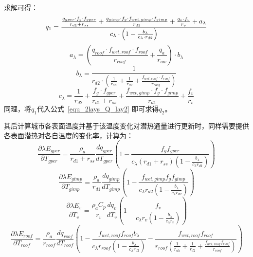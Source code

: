 求解可得：
\begin{equation}
    q_{1} = \\
    \frac{\frac{q_{gper} \cdot f_{g} \cdot f_{gper}}{r_{d1}+r_{ss}} + \frac{q_{gimp} \cdot f_{g} \cdot f_{wet,gimp} \cdot f_{gimp}}{r_{d1} } + \frac{q_{v} \cdot f_v}{r_{v}} + a_{\lambda}}{c_{\lambda} \cdot \left( 1 - \frac{b_{\lambda}}{c_{\lambda} \cdot r_{d2}}\right)}
\end{equation}
%
\begin{equation}
    a_{\lambda}= \left(\frac{q_{roof} \cdot f_{wet,roof} \cdot f_{roof}}{r_{roof}} + \frac{q_a}{r_{aw}}\right) \cdot b_{\lambda}
\end{equation}
%
\begin{equation}
    b_{\lambda} = \frac{1}{r_{d2} \cdot \left( \frac{1}{r_{aw}} + \frac{1}{r_{d2}} + \frac{f_{wet,roof} \cdot f_{roof}}{r_{roof}} \right)}
\end{equation}
%
\begin{equation}
    c_{\lambda} = \frac{1}{r_{d2}}+\frac{f_g \cdot f_{gper}}{r_{d1}+r_{ss}} + \frac{f_{wet,gimp} \cdot f_g \cdot f_{gimp}}{r_{d1}} + \frac{f_v}{r_{v}}
\end{equation}
同理，将$q_{1}$代入公式~\eqref{equ_2lays_Q_lay2} 即可求得$q_{2}$。

其后计算城市各表面温度并基于该温度变化对潜热通量进行更新时，同样需要提供各表面潜热对各自温度的变化率，计算为：
\begin{equation}
\frac{\partial \lambda E_{gper}}{\partial T_{gper}} = \frac{\rho _a}{r_{d1}+r_{ss}} \frac{dq_{gper}}{dT_{gper}} \left(1-\frac{f_{g}f_{gper}}{c_{\lambda} \left(r_{d1}+r_{ss}\right) \left(1-\frac{b_{\lambda}}{c_{\lambda} r_{d2}}\right)}\right)
\end{equation}
%
\begin{equation}
\frac{\partial \lambda E_{gimp}}{\partial T_{gimp}} = \frac{\rho _a}{r_{d1}} \frac{dq_{gimp}}{dT_{gimp}} \left(1-\frac{f_{wet,gimp} f_{g} f_{gimp}}{c_{\lambda} r_{d2}\left(1-\frac{b_{\lambda}}{c_{\lambda} r_{d2}}\right)}\right)
\end{equation}
%
\begin{equation}
\frac{\partial \lambda E_{v}}{\partial T_{v}} = \frac{\rho _a C_p}{r_{v}} \frac{dq_{v}}{dT_{v}} \left(1-\frac{f_{v}}{c_{\lambda} r_{v}\left(1-\frac{b_{\lambda}}{c_{\lambda} r_{v}}\right)}\right)
\end{equation}
%
\begin{equation}
\frac{\partial \lambda E_{roof}}{\partial T_{roof}} = \frac{\rho _a}{r_{roof}} \frac{dq_{roof}}{dT_{roof}} \left(1-\frac{f_{wet,roof}f_{roof} b_{\lambda}}{c_{\lambda} r_{roof} \left(1-\frac{b_{\lambda}}{c_{\lambda} r_{d2}}\right)}-\frac{f_{wet,roof}f_{roof}}{r_{roof}\left(\frac{1}{r_{ah}}+\frac{1}{r_{d2}}+\frac{f_{wet,roof} f_{roof}}{r_{roof}}\right)}\right)
\end{equation}


